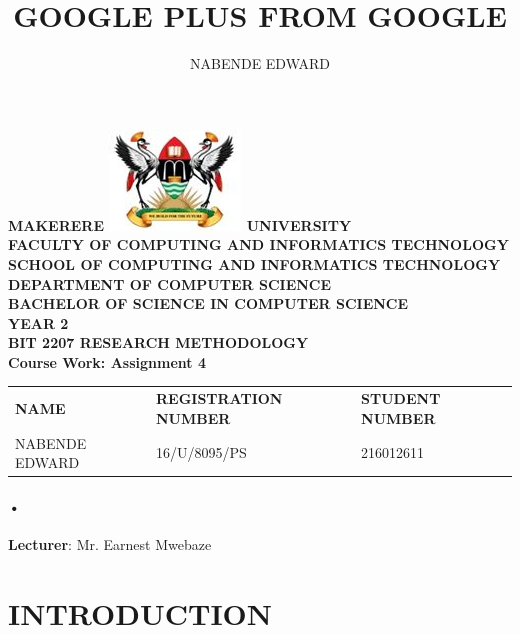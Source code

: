 \documentclass[7pt]{article}
\begin{document}
\begin{Huge}
\begin{center}
\begin{normalsize}
\textbf{MAKERERE \includegraphics[scale=0.5]{logo} UNIVERSITY }\\

\textbf{FACULTY OF COMPUTING AND INFORMATICS TECHNOLOGY} \\
\textbf{SCHOOL OF COMPUTING AND INFORMATICS TECHNOLOGY} \\
\textbf{DEPARTMENT OF COMPUTER SCIENCE} \\
\textbf{BACHELOR OF SCIENCE IN COMPUTER SCIENCE} \\
\textbf{YEAR 2} \\
\textbf{BIT 2207 RESEARCH METHODOLOGY} \\
\textbf{Course Work: Assignment 4}\\
\end{normalsize}
\end{center}
\end{Huge}

\begin{center}
\begin{tabular}{l l l}
\textbf{NAME}  & \textbf{REGISTRATION NUMBER} & \textbf{STUDENT NUMBER} \\
NABENDE EDWARD& 16/U/8095/PS & 216012611 \\
\end{tabular}

\paragraph{•}
\textbf{Lecturer}: Mr. Earnest Mwebaze
\end{center}

\newpage

\title{GOOGLE PLUS FROM GOOGLE}
\author{NABENDE EDWARD}      
\renewcommand{\today}{}

\maketitle

\section{INTRODUCTION}
\end{document}

